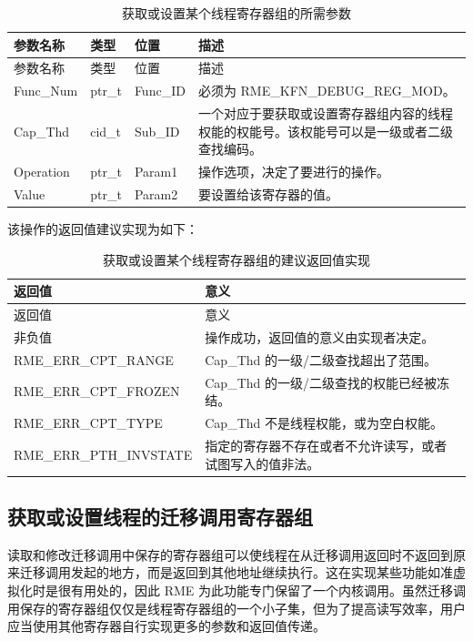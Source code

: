 \begin{xltabular}{\textwidth}{@{}>{\hsize\raggedright\arraybackslash}X>{\hsize\raggedright\arraybackslash}X>{\hsize\raggedright\arraybackslash}X>{\hsize\raggedright\arraybackslash}X@{}}
\caption{获取或设置某个线程寄存器组的所需参数}\label{tab:8-111-get-or-set-thread-register-set-parameters}\\
\toprule
参数名称 & 类型 & 位置 & 描述\tabularnewline
\endfirsthead
\toprule
参数名称 & 类型 & 位置 & 描述\tabularnewline
\midrule
\endhead
\bottomrule
\endlastfoot
Func\_Num & ptr\_t & Func\_ID & 必须为 RME\_KFN\_DEBUG\_REG\_MOD。\tabularnewline
Cap\_Thd & cid\_t & Sub\_ID &
一个对应于要获取或设置寄存器组内容的线程权能的权能号。该权能号可以是一级或者二级查找编码。\tabularnewline
Operation & ptr\_t & Param1 &
操作选项，决定了要进行的操作。\tabularnewline
Value & ptr\_t & Param2 & 要设置给该寄存器的值。\tabularnewline
\end{xltabular}

该操作的返回值建议实现为如下：

\begin{xltabular}{\textwidth}{@{}>{\hsize\raggedright\arraybackslash}X>{\hsize\raggedright\arraybackslash}X@{}}
\caption{获取或设置某个线程寄存器组的建议返回值实现}\label{tab:8-112-get-or-set-thread-register-set-suggested-return-values}\\
\toprule
返回值 & 意义\tabularnewline
\endfirsthead
\toprule
返回值 & 意义\tabularnewline
\midrule
\endhead
\bottomrule
\endlastfoot
    非负值 & 操作成功，返回值的意义由实现者决定。\tabularnewline
    RME\_ERR\_CPT\_RANGE & Cap\_Thd 的一级/二级查找超出了范围。\tabularnewline
    RME\_ERR\_CPT\_FROZEN & Cap\_Thd 的一级/二级查找的权能已经被冻结。\tabularnewline
    RME\_ERR\_CPT\_TYPE & Cap\_Thd 不是线程权能，或为空白权能。\tabularnewline
    RME\_ERR\_PTH\_INVSTATE & 指定的寄存器不存在或者不允许读写，或者试图写入的值非法。\tabularnewline
\end{xltabular}

\subsection{获取或设置线程的迁移调用寄存器组}\label{subsec:8-get-or-set-thread-migration-call-register-set}

读取和修改迁移调用中保存的寄存器组可以使线程在从迁移调用返回时不返回到原来迁移调用发起的地方，而是返回到其他地址继续执行。这在实现某些功能如准虚拟化时是很有用处的，因此 RME 为此功能专门保留了一个内核调用。虽然迁移调用保存的寄存器组仅仅是线程寄存器组的一个小子集，但为了提高读写效率，用户应当使用其他寄存器自行实现更多的参数和返回值传递。

